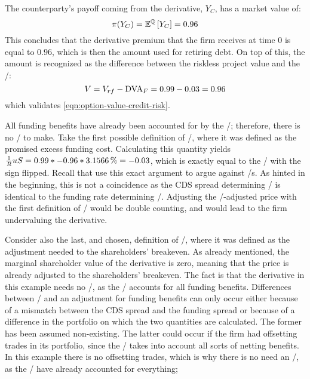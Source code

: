 \documentclass[main.tex]{subfiles}
\begin{document}
            The counterparty's payoff coming from the derivative, $Y_C$, has a market value of:
            \begin{equation}
                \pi(Y_{C}) = \mathbb{E}^{\mathbb{Q}}\left[Y_{C}\right] = \num{0.96}
            \end{equation}
            This concludes that the derivative premium that the firm receives at time 0 is equal to $\num{0.96}$, 
            which is then the amount used for retiring debt. 
            On top of this, the amount is recognized as the difference between the riskless project value and the \DVA/:
            \begin{equation}
                V = V_{rf} - \DVA/_F = \num{0.99} - \num{0.03} = \num{0.96}
            \end{equation}
            which validates \cref{eqn:option-value-credit-risk}. 

            All funding benefits have already been accounted for by the \DVA/;
            therefore, there is no \FVA/ to make.
            Take the first possible definition of \FVA/, 
            where it was defined as the promised excess funding cost.
            Calculating this quantity yields 
            $\discountfactor u S = \num{0.99} * \num{-0.96} * \pct{0.031566} = \num{-0.03}$,
            which is exactly equal to the \DVA/ with the sign flipped.
            Recall that \textcite{HullWhite2012FVA} use this exact argument to argue against \FVA/s.
            As hinted in the beginning, 
            this is not a coincidence as the CDS spread determining \DVA/
            is identical to the funding rate determining \FVA/.
            Adjusting the \DVA/-adjusted price with the first definition of \FVA/ would be double counting,
            and would lead to the firm undervaluing the derivative.
            
            Consider also the last, and chosen, definition of \FVA/,
            where it was defined as the adjustment needed to the shareholders' breakeven.
            As already mentioned, the marginal shareholder value of the derivative is zero,
            meaning that the price is already adjusted to the shareholders' breakeven.
            The fact is that the derivative in this example needs no \FVA/,
            as the \DVA/ accounts for all funding benefits.
            Differences between \DVA/ and an adjustment for funding benefits can only occur 
            either because of a mismatch between the CDS spread and the funding spread
            or because of a difference in the portfolio on which the two quantities are calculated. 
            The former has been assumed non-existing.
            The latter could occur if the firm had offsetting trades in its portfolio,
            since the \FVA/ takes into account all sorts of netting benefits.
            In this example there is no offsetting trades, 
            which is why there is no need an \FVA/, as the \DVA/ have already accounted for everything;
\end{document}
